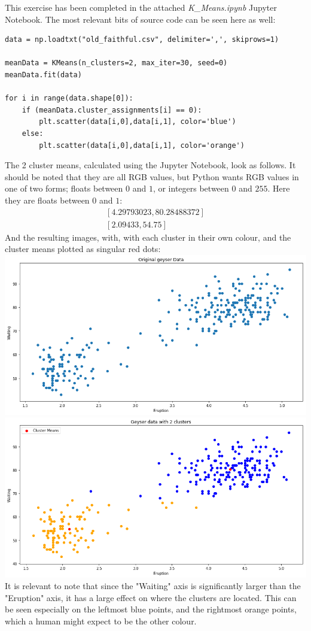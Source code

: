 This exercise has been completed in the attached \textit{K\_Means.ipynb} Jupyter Notebook. The most relevant bits of source code can be seen here as well:
\begin{verbatim}
data = np.loadtxt("old_faithful.csv", delimiter=',', skiprows=1)

meanData = KMeans(n_clusters=2, max_iter=30, seed=0)
meanData.fit(data)

for i in range(data.shape[0]):
    if (meanData.cluster_assignments[i] == 0):
        plt.scatter(data[i,0],data[i,1], color='blue')
    else:
        plt.scatter(data[i,0],data[i,1], color='orange')
\end{verbatim}
The 2 cluster means, calculated using the Jupyter Notebook, look as follows. It should be noted that they are all RGB values, but Python wants RGB values in one of two forms; floats between $0$ and $1$, or integers between $0$ and $255$. Here they are floats between $0$ and $1$:
$$
\begin{matrix}
[4.29793023,80.28488372] \\
[2.09433,54.75]
\end{matrix}
$$
And the resulting images, with, with each cluster in their own colour, and the cluster means plotted as singular red dots:\\
\includegraphics[width=\linewidth]{3a1.png}\\
\includegraphics[width=\linewidth]{3a2.png}\\
It is relevant to note that since the "Waiting" axis is significantly larger than the "Eruption" axis, it has a large effect on where the clusters are located. This can be seen especially on the leftmost blue points, and the rightmost orange points, which a human might expect to be the other colour.